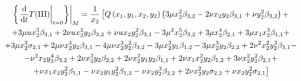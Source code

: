\documentclass[../main.tex]{subfiles}
\begin{document}
\begin{multline}\label{eq:appendix_t3}
\left.\left\{ \left.\frac{\mathrm d}{\mathrm{d}t}T(\mathrm{\RN{3}})\right|_{t = 0}\right\} \right|_M = \frac{1}{x_2} \left[Q\left(x_1,y_1,x_2,y_2\right) \left(3 \mu  x_2^2 \beta _{3,2}-2 \nu  x_2 y_2 \beta _{3,1}+\nu  y_2^2 \beta _{3,2}\right) + \right. \\
\left.+3 \mu  u x_2^3 \beta_{3,1}+2 \nu  u x_2^2 y_2 \beta _{3,2}+\nu  u x_2 y_2^2 \beta _{3,1}-3 \mu ^2 x_2^5 \beta _{3,2}+3 \mu  x_2^4 \beta _{2,1}+3 \mu x_1 x_2^3 \beta_{1,1} +\right. \\ 
\left. + 3 \mu  x_2^3 \sigma _{2,1}+2 \mu \nu  x_2^4 y_2 \beta _{3,1}-4 \mu  \nu  x_2^3 y_2^2 \beta _{3,2}-3 \mu  x_2^3 y_1 \beta _{1,2}-3 \mu x_2^3 y_2 \beta _{2,2}+2 \nu ^2 x_2^2 y_2^3 \beta _{3,1} - \right. \\ 
\left. -\nu ^2 x_2 y_2^4 \beta _{3,2}+2 \nu  x_2^3 y_2 \beta _{2,2}+2 \nu  x_2^2 y_1 y_2 \beta_{1,1}+2 \nu  x_1 x_2^2 y_2 \beta _{1,2}+3 \nu  x_2^2 y_2^2 \beta _{2,1} + \right. \\
\left. +\nu  x_1 x_2 y_2^2 \beta _{1,1}-\nu  x_2 y_1 y_2^2 \beta _{1,2}-\nu  x_2 y_2^3 \beta _{2,2}+2 \nu  x_2^2 y_2 \sigma _{2,2}+\nu  x_2 y_2^2 \sigma _{2,1}\right]
\end{multline}
\end{document}
